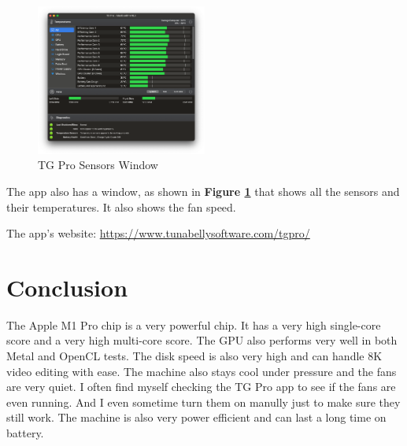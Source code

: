 \documentclass[a4paper]{article}
\begin{document}
\begin{figure}[h!]
    \centering
    \includegraphics[width=0.5\textwidth]{images/tgpro-interface.png}
    \caption{TG Pro Sensors Window}
    \label{fig:tgpro-sensors}
\end{figure}

The app also has a window, as shown in \textbf{Figure \ref{fig:tgpro-sensors}} that shows all the sensors and their temperatures. It also shows the fan speed.

The app's website: \url{https://www.tunabellysoftware.com/tgpro/}

\section{Conclusion}

The Apple M1 Pro chip is a very powerful chip. It has a very high single-core score and a very high multi-core score. The GPU also performs very well in both Metal and OpenCL tests. The disk speed is also very high and can handle 8K video editing with ease. The machine also stays cool under pressure and the fans are very quiet. I often find myself checking the TG Pro app to see if the fans are even running. And I even sometime turn them on manully just to make sure they still work. The machine is also very power efficient and can last a long time on battery. 
\end{document}
